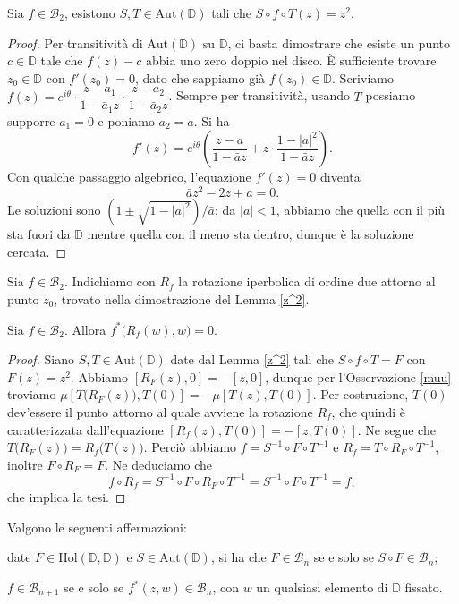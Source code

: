 \begin{lm} \label{z^2}
  Sia $f \in \mathcal{B}_2$, esistono $S, T \in \text{Aut}(\mathbb{D})$ tali che $S\circ f\circ T(z)=z^2$.
\end{lm}

\begin{proof}
  Per transitività di $\text{Aut}(\mathbb{D})$ su $\mathbb{D}$, ci basta dimostrare che esiste un punto $c \in \mathbb{D}$ tale che $f(z)-c$ abbia uno zero doppio nel disco. È sufficiente trovare $z_0 \in \mathbb{D}$ con $f'(z_0)=0$, dato che sappiamo già $f(z_0) \in \mathbb{D}$. Scriviamo $f(z)=e^{i\theta}\cdot\dfrac{z-a_1}{1-\bar{a}_1z}\cdot\dfrac{z-a_2}{1-\bar{a}_2z}$.
  Sempre per transitività, usando $T$ possiamo supporre $a_1=0$ e poniamo $a_2=a$. Si ha
  $$f'(z)=e^{i\theta}\left(\frac{z-a}{1-\bar{a}z}+z\cdot\frac{1-|a|^2}{1-\bar{a}z}\right).$$
  Con qualche passaggio algebrico, l'equazione $f'(z)=0$ diventa
  $$\bar{a}z^2-2z+a=0.$$
  Le soluzioni sono $(1 \pm \sqrt{1-|a|^2})/\bar{a}$; da $|a|<1$, abbiamo che quella con il più sta fuori da $\mathbb{D}$ mentre quella con il meno sta dentro, dunque è la soluzione cercata.
\end{proof}

\begin{defn}
  Sia $f \in \mathcal{B}_2$. Indichiamo con $R_f$ la rotazione iperbolica di ordine due attorno al punto $z_0$, trovato nella dimostrazione del Lemma \ref{z^2}.
\end{defn}

\begin{cor} \label{rotazioni}
  Sia $f \in \mathcal{B}_2$. Allora $f^*\bigl(R_f(w),w\bigr)=0$.
\end{cor}

\begin{proof}
  Siano $S, T \in \text{Aut}(\mathbb{D})$ date dal Lemma \ref{z^2} tali che $S\circ f\circ T=F$ con $F(z)=z^2$. Abbiamo $[R_F(z),0]=-[z,0]$, dunque per l'Osservazione \ref{muu} troviamo $\mu[T\bigl(R_F(z)\bigr),T(0)]=-\mu[T(z),T(0)]$.
  Per costruzione, $T(0)$ dev'essere il punto attorno al quale avviene la rotazione $R_f$, che quindi è caratterizzata dall'equazione $[R_f(z),T(0)]=-[z,T(0)]$. Ne segue che $T\bigl(R_F(z)\bigr)=R_f\bigl(T(z)\bigr)$. Perciò abbiamo $f=S^{-1}\circ F\circ T^{-1}$ e $R_f=T\circ R_F\circ T^{-1}$, inoltre $F\circ R_F=F$. Ne deduciamo che
  $$f\circ R_f=S^{-1}\circ F\circ R_F\circ T^{-1}=S^{-1}\circ F\circ T^{-1}=f,$$
  che implica la tesi.
\end{proof}

\begin{prop} \label{blaschke-prop}
  Valgono le seguenti affermazioni:
  \begin{nlist}
    \item date $F \in \text{Hol}(\mathbb{D},\mathbb{D})$ e $S \in \text{Aut}(\mathbb{D})$, si ha che $F \in \mathcal{B}_n$ se e solo se $S\circ F \in \mathcal{B}_n$;
    \item $f \in \mathcal{B}_{n+1}$ se e solo se $f^*(z,w) \in \mathcal{B}_n$, con $w$ un qualsiasi elemento di $\mathbb{D}$ fissato.
  \end{nlist}
\end{prop}

